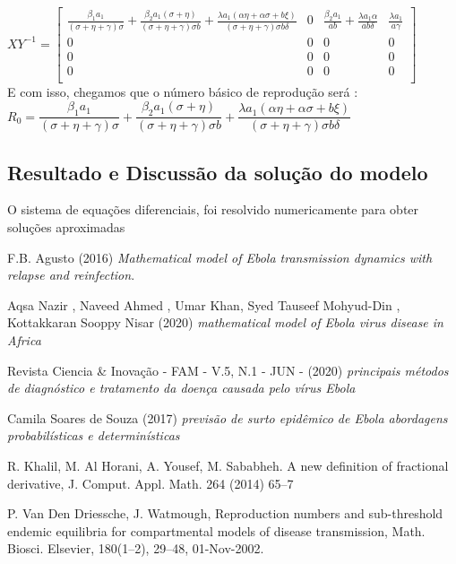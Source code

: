\documentclass[12pt,a4paper]{article}
\begin{document}
$X Y^{-1} = \begin{bmatrix}
\frac{\beta_1 a_1}{(\sigma + \eta + \gamma)\sigma} + \frac{\beta_2 a_1(\sigma + \eta)}{(\sigma + \eta + \gamma)\sigma b} + \frac{\lambda a_1(\alpha \eta + \alpha \sigma + b\xi)}{(\sigma + \eta + \gamma)\sigma b \delta} & 0 & \frac{\beta_2 a_1}{ab} +  \frac{\lambda a_1 \alpha}{ab\delta} & \frac{\lambda a_1}{a \gamma}  \\
0 & 0 & 0 & 0\\
0 & 0 & 0 & 0\\
0 & 0 & 0 & 0\\
\end{bmatrix}$ \vspace{3mm}\\ E com isso, chegamos que o número básico de reprodução será :\vspace{2mm}\\ $R_0 = \dfrac{\beta_1 a_1}{(\sigma + \eta + \gamma)\sigma} + \dfrac{\beta_2 a_1(\sigma + \eta)}{(\sigma + \eta + \gamma)\sigma b} + \dfrac{\lambda a_1(\alpha \eta + \alpha \sigma + b\xi)}{(\sigma + \eta + \gamma)\sigma b \delta}$


\subsection{Resultado e Discussão da solução do modelo}

\noindent O sistema de equações diferenciais, foi resolvido numericamente para obter soluções aproximadas



\begin{thebibliography}{9}
F.B. Agusto (2016) \emph{Mathematical model of Ebola transmission dynamics with relapse and reinfection}.

Aqsa Nazir , Naveed Ahmed , Umar Khan, Syed Tauseef Mohyud-Din , Kottakkaran Sooppy Nisar (2020) \emph{mathematical model of Ebola virus disease in Africa} 

Revista Ciencia & Inovação - FAM - V.5, N.1 - JUN - (2020) \emph{principais métodos de diagnóstico
e tratamento da doença causada pelo vírus Ebola} 

Camila Soares de Souza (2017) \emph{previsão de surto epidêmico de Ebola abordagens probabilísticas e determinísticas}

R. Khalil, M. Al Horani, A. Yousef, M. Sababheh. A new deﬁnition of fractional derivative, J. Comput. Appl. Math. 264 (2014) 65–7

P. Van Den Driessche, J. Watmough, Reproduction numbers
and sub-threshold endemic equilibria for compartmental models
of disease transmission, Math. Biosci. Elsevier, 180(1–2), 29–48,
01-Nov-2002.
\end{thebibliography}
\end{document}
